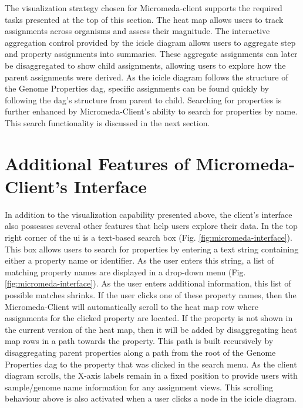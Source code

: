 The visualization strategy chosen for Micromeda-client supports the required 
tasks presented at the top of this section. The heat map allows users to track 
assignments across organisms and assess their magnitude. The interactive 
aggregation control provided by the icicle diagram allows users to aggregate 
step and property assignments into summaries. These aggregate assignments can 
later be disaggregated to show child assignments, allowing users to explore how 
the parent assignments were derived. As the icicle diagram follows the structure 
of the Genome Properties \gls{dag}, specific assignments can be found quickly by 
following the \gls{dag}'s structure from parent to child. Searching for 
properties is further enhanced by Micromeda-Client's ability to search for 
properties by name. This search functionality is discussed in the next section.

\section{Additional Features of Micromeda-Client's Interface} 
\label{client-additional-features}

In addition to the visualization capability presented above, the client's 
interface also possesses several other features that help users explore their 
data. In the top right corner of the \gls{ui} is a text-based search box (Fig. 
\ref{fig:micromeda-interface}). This box allows users to search for properties 
by entering a text string containing either a property name or identifier. As 
the user enters this string, a list of matching property names are displayed in 
a drop-down menu (Fig. \ref{fig:micromeda-interface}). As the user enters 
additional information, this list of possible matches shrinks. If the user 
clicks one of these property names, then the Micromeda-Client will automatically 
scroll to the heat map row where assignments for the clicked property are 
located. If the property is not shown in the current version of the heat map, 
then it will be added by disaggregating heat map rows in a path towards the 
property. This path is built recursively by disaggregating parent properties 
along a path from the root of the Genome Properties \gls{dag} to the property 
that was clicked in the search menu. As the client diagram scrolls, the X-axis 
labels remain in a fixed position to provide users with sample/genome name 
information for any assignment views. This scrolling behaviour above is also 
activated when a user clicks a node in the icicle diagram.

